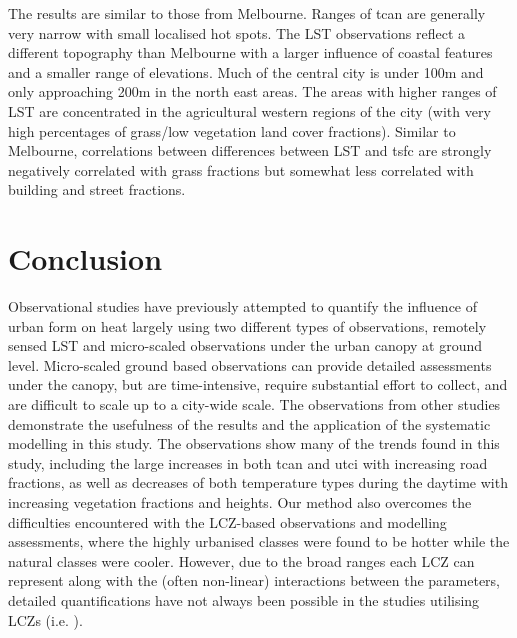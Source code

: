 \documentclass[final,3p,times,authoryear]{elsarticle}
\begin{document}
The results are similar to those from Melbourne. Ranges of \gls{tcan} are generally very narrow with small localised hot spots. The LST observations reflect a different topography than Melbourne with a larger influence of coastal features and a smaller range of elevations. Much of the central city is under 100m and only approaching 200m in the north east areas. The areas with higher ranges of LST are concentrated in the agricultural western regions of the city (with very high percentages of grass/low vegetation land cover fractions). Similar to Melbourne, correlations between differences between LST and \gls{tsfc} are strongly negatively correlated with grass fractions but somewhat less correlated with building and street fractions.


\section{Conclusion}\label{sec:conclusion}

Observational studies have previously attempted to quantify the influence of urban form on heat largely using two different types of observations, remotely sensed LST and micro-scaled observations under the urban canopy at ground level. Micro-scaled ground based observations can provide detailed assessments under the canopy, but are time-intensive, require substantial effort to collect, and are difficult to scale up to a city-wide scale. The observations from other studies demonstrate the usefulness of the results and the application of the systematic modelling in this study. The observations show many of the trends found in this study, including the large increases in both \gls{tcan} and \gls{utci} with increasing road fractions, as well as decreases of both temperature types during the daytime with increasing vegetation fractions and heights. Our method also overcomes the difficulties encountered with the LCZ-based observations and modelling assessments, where the highly urbanised classes were found to be hotter while the natural classes were cooler. However, due to the broad ranges each LCZ can represent along with the (often non-linear) interactions between the parameters, detailed quantifications have not always been possible in the studies utilising LCZs (i.e. \cite{Emery2021}). 
\end{document}
